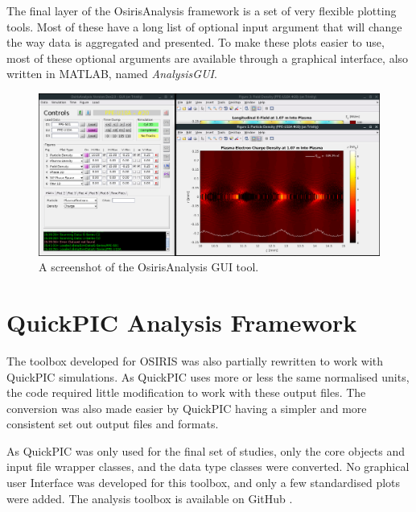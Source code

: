 The final layer of the OsirisAnalysis framework is a set of very flexible plotting tools.
Most of these have a long list of optional input argument that will change the way data is aggregated and presented.
To make these plots easier to use, most of these optional arguments are available through a graphical interface, also written in MATLAB, named \emph{AnalysisGUI}.

\begin{figure}[hbt]
    \centering
    \includegraphics[width=0.99\linewidth,trim={0mm 0mm 0mm 0mm},clip]{images/OsirisAnalysisGUI}
    \caption{\label{Fig:OAGUI} A screenshot of the OsirisAnalysis GUI tool.}
\end{figure}

\section{QuickPIC Analysis Framework}
\label{Tools:QA}

The toolbox developed for OSIRIS was also partially rewritten to work with QuickPIC simulations.
As QuickPIC uses more or less the same normalised units, the code required little modification to work with these output files.
The conversion was also made easier by QuickPIC having a simpler and more consistent set out output files and formats.

As QuickPIC was only used for the final set of studies, only the core objects and input file wrapper classes, and the data type classes were converted.
No graphical user Interface was developed for this toolbox, and only a few standardised plots were added.
The analysis toolbox is available on GitHub \cite{code:quickpic_analysis:2017}.
